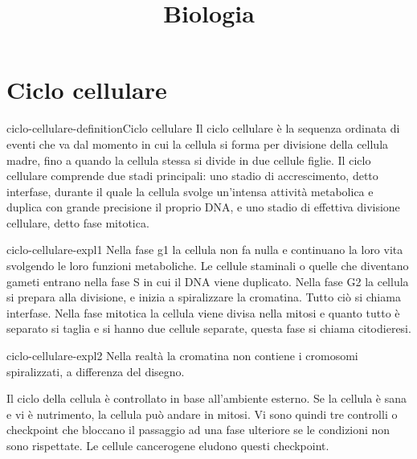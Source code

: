 \documentclass[preview]{standalone}
\begin{document}
\title{Biologia}
\genpage

\section{Ciclo cellulare}

\begin{snippetdefinition}{ciclo-cellulare-definition}{Ciclo cellulare}
    Il ciclo cellulare è la sequenza ordinata di eventi che va dal momento in cui la cellula si forma
    per divisione della cellula madre, fino a quando la cellula stessa si divide in due cellule figlie.
    Il ciclo cellulare comprende due stadi principali: uno stadio di accrescimento, detto interfase,
    durante il quale la cellula svolge un’intensa attività metabolica e duplica con grande
    precisione il proprio DNA, e uno stadio di effettiva divisione cellulare, detto fase mitotica.
\end{snippetdefinition}


\begin{snippet}{ciclo-cellulare-expl1}
    Nella fase g1 la cellula non fa nulla e continuano la loro vita svolgendo le loro funzioni metaboliche. 
    Le cellule staminali o quelle che diventano gameti entrano nella fase S in cui il DNA viene duplicato. 
    Nella fase G2 la cellula si prepara alla divisione, e inizia a spiralizzare la cromatina. 
    Tutto ciò si chiama interfase.
    Nella fase mitotica la cellula viene divisa nella mitosi e quanto tutto è separato si taglia e si hanno due cellule separate, questa fase si chiama citodieresi.
\end{snippet}


\begin{snippet}{ciclo-cellulare-expl2}
    Nella realtà la cromatina non contiene i cromosomi spiralizzati, a differenza del disegno.

    Il ciclo della cellula è controllato in base all'ambiente esterno.
    Se la cellula è sana e vi è nutrimento, la cellula può andare in mitosi.
    Vi sono quindi tre controlli o checkpoint che bloccano il passaggio ad una fase ulteriore
    se le condizioni non sono rispettate.
    Le cellule cancerogene eludono questi checkpoint.
\end{snippet}
\end{document}
